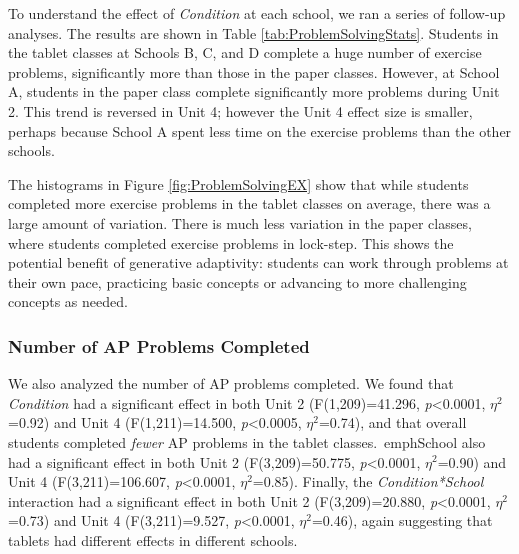 \documentclass{sigchi}
\begin{document}
To understand the effect of \emph{Condition} at each school, we ran a series of follow-up analyses. The results are shown in Table \ref{tab:ProblemSolvingStats}. Students in the tablet classes at Schools B, C, and D complete a huge number of exercise problems, significantly more than those in the paper classes. However, at School A, students in the paper class complete significantly more problems during Unit 2. This trend is reversed in Unit 4; however the Unit 4 effect size is smaller, perhaps because School A spent less time on the exercise problems than the other schools.

The histograms in Figure \ref{fig:ProblemSolvingEX} show that while students completed more exercise problems in the tablet classes on average, there was a large amount of variation. There is much less variation in the paper classes, where students completed exercise problems in lock-step. This shows the potential benefit of generative adaptivity: students can work through problems at their own pace, practicing basic concepts or advancing to more challenging concepts as needed.






\subsubsection{Number of AP Problems Completed}
We also analyzed the number of AP problems completed. We found that \emph{Condition} had a significant effect in both Unit 2 (F(1,209)=41.296, \emph{p}\textless0.0001, $\eta^2$=0.92) and Unit 4 (F(1,211)=14.500, \emph{p}\textless0.0005, $\eta^2$=0.74), and that overall students completed \emph{fewer} AP problems in the tablet classes.\ emph{School} also had a significant effect in both Unit 2 (F(3,209)=50.775, \emph{p}\textless0.0001, $\eta^2$=0.90) and Unit 4 (F(3,211)=106.607, \emph{p}\textless0.0001, $\eta^2$=0.85). Finally, the \emph{Condition*School} interaction had a significant effect in both Unit 2 (F(3,209)=20.880, \emph{p}\textless0.0001, $\eta^2$=0.73) and Unit 4 (F(3,211)=9.527, \emph{p}\textless0.0001, $\eta^2$=0.46), again suggesting that tablets had different effects in different schools.
\end{document}
